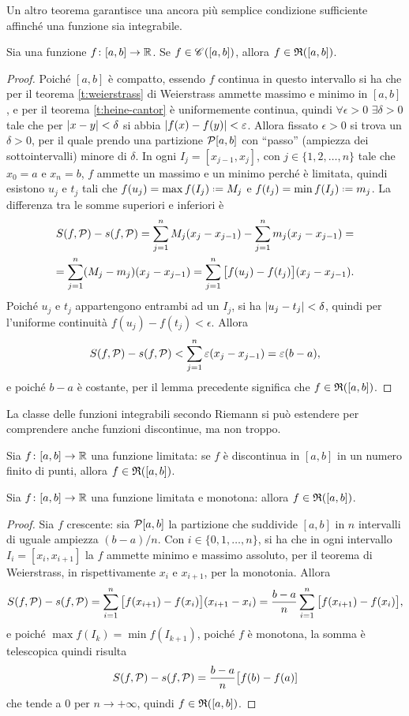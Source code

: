 Un altro teorema garantisce una ancora più semplice condizione sufficiente affinché una funzione sia integrabile.
\begin{teorema} \label{t:continua-integrabile}
Sia una funzione $f\colon[a,b]\to\mathbb{R}$. Se $f\in\mathscr C^{}([a,b])$, allora $f\in\mathfrak{R}([a,b])$.
\end{teorema}
\begin{proof}
Poiché $[a,b]$ è compatto, essendo $f$ continua in questo intervallo si ha che per il teorema \ref{t:weierstrass} di Weierstrass ammette massimo e minimo in $[a,b]$, e per il teorema \ref{t:heine-cantor} è uniformemente continua, quindi $\forall\epsilon>0$ $\exists\delta>0$ tale che per $\lvert x-y\rvert<\delta$ si abbia $\lvert f(x)-f(y)\rvert<\varepsilon$.
Allora fissato $\epsilon>0$ si trova un $\delta>0$, per il quale prendo una partizione $\mathcal{P}[a,b]$ con ``passo'' (ampiezza dei sottointervalli) minore di $\delta$. In ogni $I_j=[x_{j-1},x_j]$, con $j\in\{1,2,\dots,n\}$ tale che $x_0=a$ e $x_n=b$, $f$ ammette un massimo e un minimo perché è limitata, quindi esistono $u_j$ e $t_j$ tali che $f(u_j)=\max f(I_j)\defeq M_j$ e $f(t_j)=\min f(I_j)\defeq m_j$. La differenza tra le somme superiori e inferiori è
\begin{multline}
S(f,\mathcal{P})-s(f,\mathcal{P})=\sum_{j=1}^nM_j(x_j-x_{j-1})-\sum_{j=1}^nm_j(x_j-x_{j-1})=\\
=\sum_{j=1}^n(M_j-m_j)(x_j-x_{j-1})=\sum_{j=1}^n\big[f(u_j)-f(t_j)\big](x_j-x_{j-1}).
\end{multline}
Poiché $u_j$ e $t_j$ appartengono entrambi ad un $I_j$, si ha $\lvert u_j-t_j\rvert<\delta$, quindi per l'uniforme continuità $f(u_j)-f(t_j)<\epsilon$. Allora
\[
S(f,\mathcal{P})-s(f,\mathcal{P})<\sum_{j=1}^n\varepsilon(x_j-x_{j-1})=\varepsilon(b-a),
\]
e poiché $b-a$ è costante, per il lemma precedente significa che $f\in\mathfrak{R}([a,b])$.
\end{proof}
La classe delle funzioni integrabili secondo Riemann si può estendere per comprendere anche funzioni discontinue, ma non troppo.
\begin{osservazione}
Sia $f\colon[a,b]\to\mathbb{R}$ una funzione limitata: se $f$ è discontinua in $[a,b]$ in un numero finito di punti, allora $f\in\mathfrak{R}([a,b])$.
\end{osservazione}
\begin{teorema}
Sia $f\colon[a,b]\to\mathbb{R}$ una funzione limitata e monotona: allora $f\in\mathfrak{R}([a,b])$.
\end{teorema}
\begin{proof}
Sia $f$ crescente: sia $\mathcal{P}[a,b]$ la partizione che suddivide $[a,b]$ in $n$ intervalli di uguale ampiezza $(b-a)/n$. Con $i\in\{0,1,\dots,n\}$, si ha che in ogni intervallo $I_i=[x_i,x_{i+1}]$ la $f$ ammette minimo e massimo assoluto, per il teorema di Weierstrass, in rispettivamente $x_i$ e $x_{i+1}$, per la monotonia. Allora
\[
S(f,\mathcal{P})-s(f,\mathcal{P})=\sum_{i=1}^n\big[f(x_{i+1})-f(x_i)\big](x_{i+1}-x_i)=\frac{b-a}{n}\sum_{i=1}^n\big[f(x_{i+1})-f(x_i)\big],
\]
e poiché $\max f(I_k)=\min f(I_{k+1})$, poiché $f$ è monotona, la somma è telescopica quindi risulta
\[
S(f,\mathcal{P})-s(f,\mathcal{P})=\frac{b-a}{n}\big[f(b)-f(a)]
\]
che tende a 0 per $n\to+\infty$, quindi $f\in\mathfrak{R}([a,b])$.
\end{proof}

